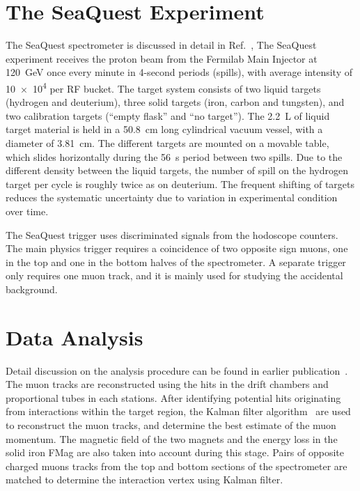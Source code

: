 \documentclass[reprint,aps,unsortedaddress,superscriptaddress,prl,floatfix,showpacs,linenumbers,final]{revtex4-2}
\begin{document}
\section{The SeaQuest Experiment}
\label{sec:seaquest_spectrometer}
The SeaQuest spectrometer is  discussed in detail in Ref.~\cite{aidala2019},
The SeaQuest experiment receives the  proton beam from the Fermilab Main Injector at \SI{120}{\GeV}
once every minute in 4-second periods (spills), with average intensity of \num{10e4} per RF bucket.
The target system consists of two liquid targets (hydrogen and deuterium),
three solid targets (iron, carbon and tungsten), and two calibration targets (``empty flask'' and ``no target'').
The \SI{2.2}{\liter} of liquid target material is held
in a \SI{50.8}{\cm} long cylindrical vacuum vessel, with a diameter of \SI{3.81}{\cm}.
The different targets are mounted on a movable table,
which slides horizontally during the \SI{56}{\s} period between two spills.
Due to the different density between the liquid targets, the number of spill on the
hydrogen target per cycle is roughly twice as on deuterium.
The frequent shifting of targets reduces the systematic uncertainty due to variation in experimental condition over time. 

The SeaQuest trigger uses discriminated signals from the hodoscope counters.
The main physics trigger requires a coincidence of two opposite sign muons,
one in the top and one in the bottom halves of the spectrometer.
A separate trigger only requires one muon track, and it is mainly used for studying the accidental background.

\section{Data Analysis}
\label{sec:analysis}
Detail discussion on the analysis procedure can be found in earlier publication~\cite{dove2021,dove2023}.
The muon tracks are reconstructed using the hits in the drift chambers and proportional tubes in each stations. 
After identifying potential hits originating from interactions within the target region,
the Kalman filter algorithm~\cite{kalman1960} are used to reconstruct the muon tracks,
and determine the best estimate of the muon momentum.
The magnetic field of the two magnets and the energy loss in the solid iron FMag are also taken into account during this stage.
Pairs of opposite charged muons tracks from the top and bottom sections of the spectrometer are
matched to determine the interaction vertex using Kalman filter.
\end{document}
